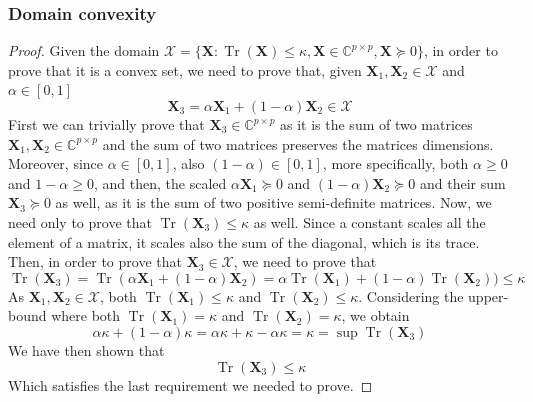 \documentclass[12pt]{article}
\DeclareMathOperator*{\tr}{Tr}
\newcommand{\boldX}{\mathbf{X}}
\newcommand{\setX}{\mathcal{X}}
\begin{document}
\subsubsection{Domain convexity}
\begin{proof}
Given the domain $\setX = \{ \boldX : \tr(\boldX) \leq \kappa, \boldX \in \mathbb{C}^{p \times p}, \boldX \succeq 0 \}$, in order to prove that it is a convex set, we need to prove that, given $\boldX_1, \boldX_2 \in \setX$ and $\alpha \in [0,1]$
\begin{equation}
    \boldX_3 = \alpha \boldX_1 + (1 - \alpha) \boldX_2 \in \setX
\end{equation}
First we can trivially prove that $\boldX_3 \in \mathbb{C}^{p \times p}$ as it is the sum of two matrices $\boldX_1, \boldX_2 \in \mathbb{C}^{p \times p}$ and the sum of two matrices preserves the matrices dimensions. Moreover, since $\alpha \in [0, 1]$, also $(1 - \alpha) \in [0, 1]$, more specifically, both $\alpha \geq 0$ and $1 - \alpha \geq 0$, and then, the scaled $\alpha\boldX_1 \succeq 0$ and $(1 - \alpha) \boldX_2 \succeq 0$ and their sum $\boldX_3 \succeq 0$ as well, as it is the sum of two positive semi-definite matrices. Now, we need only to prove that $\tr(\boldX_3) \leq \kappa$ as well. Since a constant scales all the element of a matrix, it scales also the sum of the diagonal, which is its trace. Then, in order to prove that $\boldX_3 \in \setX$, we need to prove that
\begin{equation}
    \tr(\boldX_3) = \tr(\alpha \boldX_1 + (1 - \alpha) \boldX_2) = \alpha \tr(\boldX_1) + (1 - \alpha) \tr(\boldX_2)) \leq \kappa
\end{equation}
As $\boldX_1, \boldX_2 \in \setX$, both $\tr(\boldX_1) \leq \kappa$ and $\tr(\boldX_2) \leq \kappa$. Considering the upper-bound where both $\tr(\boldX_1) = \kappa$ and $\tr(\boldX_2) = \kappa$, we obtain
\begin{equation}
    \alpha \kappa + (1 - \alpha)\kappa = \alpha \kappa + \kappa - \alpha \kappa = \kappa = \sup \tr(\boldX_3)
\end{equation}
We have then shown that
\begin{equation}
    \tr(\boldX_3) \leq \kappa
\end{equation}
Which satisfies the last requirement we needed to prove.
\end{proof}
\end{document}
